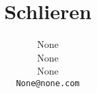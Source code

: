 \documentclass[10pt,twocolumn,letterpaper]{article}
\begin{document}
\title{Schlieren}

\author{None\\
None\\
None\\
{\tt\small None@none.com}
}


\maketitle










 



{\small


}

\newpage
%
\end{document}
